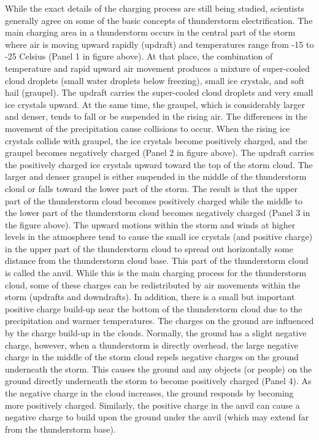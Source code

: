 \documentclass[12pt,oneside]{book}
\begin{document}
While the exact details of the charging process are still being studied,
scientists generally agree on some of the basic concepts of thunderstorm
electrification. The main charging area in a thunderstorm occurs in the
central part of the storm where air is moving upward rapidly (updraft)
and temperatures range from -15 to -25 Celsius (Panel 1 in figure
above). At that place, the combination of temperature and rapid upward
air movement produces a mixture of super-cooled cloud droplets (small
water droplets below freezing), small ice crystals, and soft hail
(graupel). The updraft carries the super-cooled cloud droplets and very
small ice crystals upward. At the same time, the graupel, which is
considerably larger and denser, tends to fall or be suspended in the
rising air. The differences in the movement of the precipitation cause
collisions to occur. When the rising ice crystals collide with graupel,
the ice crystals become positively charged, and the graupel becomes
negatively charged (Panel 2 in figure above). The updraft carries the
positively charged ice crystals upward toward the top of the storm
cloud. The larger and denser graupel is either suspended in the middle
of the thunderstorm cloud or falls toward the lower part of the storm.
The result is that the upper part of the thunderstorm cloud becomes
positively charged while the middle to the lower part of the
thunderstorm cloud becomes negatively charged (Panel 3 in the figure
above). The upward motions within the storm and winds at higher levels
in the atmosphere tend to cause the small ice crystals (and positive
charge) in the upper part of the thunderstorm cloud to spread out
horizontally some distance from the thunderstorm cloud base. This part
of the thunderstorm cloud is called the anvil. While this is the main
charging process for the thunderstorm cloud, some of these charges can
be redistributed by air movements within the storm (updrafts and
downdrafts). In addition, there is a small but important positive charge
build-up near the bottom of the thunderstorm cloud due to the
precipitation and warmer temperatures. The charges on the ground are
influenced by the charge build-up in the clouds. Normally, the ground
has a slight negative charge, however, when a thunderstorm is directly
overhead, the large negative charge in the middle of the storm cloud
repels negative charges on the ground underneath the storm. This causes
the ground and any objects (or people) on the ground directly underneath
the storm to become positively charged (Panel 4). As the negative charge
in the cloud increases, the ground responds by becoming more positively
charged. Similarly, the positive charge in the anvil can cause a
negative charge to build upon the ground under the anvil (which may
extend far from the thunderstorm base).
\end{document}
